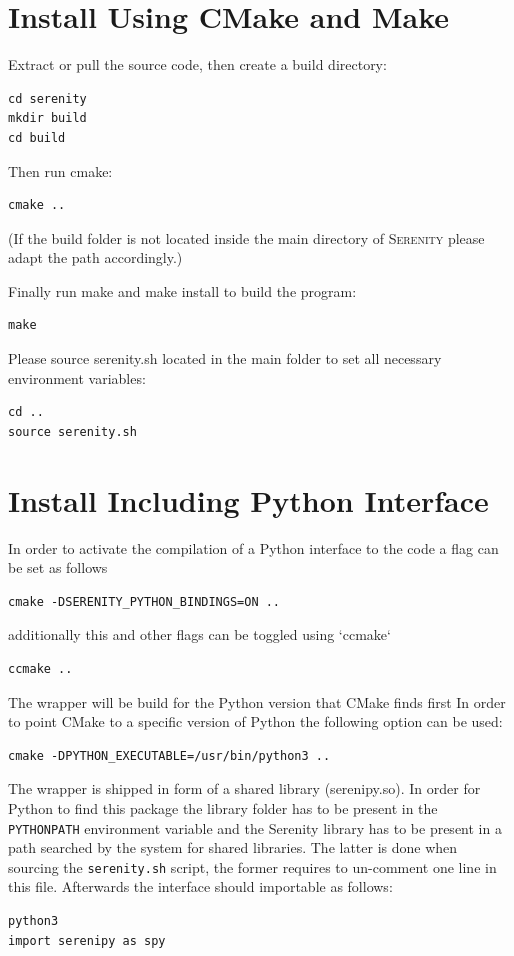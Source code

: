 \documentclass[bibliography=totocnumbered,a4paper,10pt,oneside]{scrbook}
\begin{document}
\section{Install Using CMake and Make}

Extract or pull the source code, then create a build directory:
\begin{lstlisting}
cd serenity
mkdir build
cd build
\end{lstlisting}
Then run cmake:
\begin{lstlisting}
cmake ..
\end{lstlisting}
(If the build folder is not located inside the main directory of \textsc{Serenity}
please adapt the path accordingly.)

Finally run make and make install to build the program:
\begin{lstlisting}
make
\end{lstlisting}
Please source serenity.sh located in the main folder to set all necessary environment
variables:
\begin{lstlisting}
cd ..
source serenity.sh
\end{lstlisting}
\section{Install Including Python Interface}
In order to activate the compilation of a Python interface to the code
a flag can be set as follows
\begin{lstlisting}
cmake -DSERENITY_PYTHON_BINDINGS=ON ..
\end{lstlisting}
additionally this and other flags can be toggled using `ccmake`
\begin{lstlisting}
ccmake ..
\end{lstlisting}
The wrapper will be build for the Python version that CMake finds first
In order to point CMake to a specific version of Python the following
option can be used:
\begin{lstlisting}
cmake -DPYTHON_EXECUTABLE=/usr/bin/python3 ..
\end{lstlisting}
The wrapper is shipped in form of a shared library (serenipy.so).
In order for Python to find this package the library folder has to be present
in the \texttt{PYTHONPATH} environment variable and the Serenity library has to be
present in a path searched by the system for shared libraries.
The latter is done when sourcing the \texttt{serenity.sh} script, the former requires
to un-comment one line in this file.
Afterwards the interface should importable as follows:
\begin{lstlisting}
python3
import serenipy as spy
\end{lstlisting}
\end{document}
